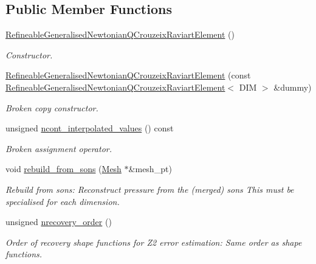 \subsection*{Public Member Functions}
\begin{DoxyCompactItemize}
\item 
\hyperlink{classoomph_1_1RefineableGeneralisedNewtonianQCrouzeixRaviartElement_a82a4fe5c2a152603bc51391de33d921c}{Refineable\+Generalised\+Newtonian\+Q\+Crouzeix\+Raviart\+Element} ()
\begin{DoxyCompactList}\small\item\em Constructor. \end{DoxyCompactList}\item 
\hyperlink{classoomph_1_1RefineableGeneralisedNewtonianQCrouzeixRaviartElement_ad809cd0afcd3a24be4146cc29be143bc}{Refineable\+Generalised\+Newtonian\+Q\+Crouzeix\+Raviart\+Element} (const \hyperlink{classoomph_1_1RefineableGeneralisedNewtonianQCrouzeixRaviartElement}{Refineable\+Generalised\+Newtonian\+Q\+Crouzeix\+Raviart\+Element}$<$ D\+IM $>$ \&dummy)
\begin{DoxyCompactList}\small\item\em Broken copy constructor. \end{DoxyCompactList}\item 
unsigned \hyperlink{classoomph_1_1RefineableGeneralisedNewtonianQCrouzeixRaviartElement_aae8a005fdf9c488de07313101792164b}{ncont\+\_\+interpolated\+\_\+values} () const
\begin{DoxyCompactList}\small\item\em Broken assignment operator. \end{DoxyCompactList}\item 
void \hyperlink{classoomph_1_1RefineableGeneralisedNewtonianQCrouzeixRaviartElement_a2615c4081c54f78cd9a76e1f8a233c29}{rebuild\+\_\+from\+\_\+sons} (\hyperlink{classoomph_1_1Mesh}{Mesh} $\ast$\&mesh\+\_\+pt)
\begin{DoxyCompactList}\small\item\em Rebuild from sons\+: Reconstruct pressure from the (merged) sons This must be specialised for each dimension. \end{DoxyCompactList}\item 
unsigned \hyperlink{classoomph_1_1RefineableGeneralisedNewtonianQCrouzeixRaviartElement_a6a5c45a61f21c73dd72bce3adf0ebd07}{nrecovery\+\_\+order} ()
\begin{DoxyCompactList}\small\item\em Order of recovery shape functions for Z2 error estimation\+: Same order as shape functions. \end{DoxyCompactList}\item 

\end{DoxyCompactItemize}
